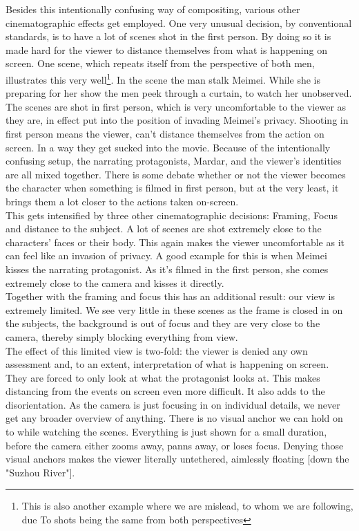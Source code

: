 \documentclass[fleqn,14pt]{article}
\begin{document}
Besides this intentionally confusing way of compositing, various other cinematographic effects get employed.
One very unusual decision, by conventional standards\cite[p. 36]{Dick}, is to have a lot of scenes shot in the first person.
By doing so it is made hard for the viewer to distance
themselves from what is happening on screen. One scene, which repeats itself from the perspective of both men,
illustrates this very well\footnote{This is also another example where we are mislead, to whom we are following, due To
shots being the same from both perspectives}. In the scene the man stalk Meimei. While she is preparing for her
show the men peek through a curtain, to watch her unobserved. The scenes are shot in first person, which is very uncomfortable
to the viewer as they are, in effect put into the position of invading Meimei's privacy. Shooting in first person means the viewer,
can't distance themselves from the action on screen. In a way they get sucked into the movie. Because of the intentionally confusing
setup, the narrating protagonists, Mardar, and the viewer's identities are all mixed together. There is some debate whether or not 
the viewer becomes the character when something is filmed in first person\cite[p. 216]{Bordwell}, but at the very least, it brings them a lot closer to
the actions taken on-screen. \\

This gets intensified by three other cinematographic decisions: Framing, Focus and distance to the subject.
A lot of scenes are shot extremely close to the characters' faces or their body. This again makes the viewer uncomfortable
as it can feel like an invasion of privacy. A good example for this is when Meimei kisses the
narrating protagonist. As it's filmed in the first person, she comes extremely close to the camera and kisses it directly.\\

Together with the framing and focus this has an additional result: our view is extremely limited. We see very little in these scenes
as the frame is closed in on the subjects, the background is out of focus and they are very close to the camera, thereby simply
blocking everything from view.\\
The effect of this limited view is two-fold: the viewer is denied any own assessment and, to an extent, interpretation of what is happening
on screen. They are forced to only look at what the protagonist looks at. This makes distancing from the events on 
screen even more difficult. It also adds to the disorientation. As the camera is just focusing in on individual details, we never
get any broader overview of anything. There is no visual anchor we can hold on to while watching the scenes. Everything is just
shown for a small duration, before the camera either zooms away, panns away, or loses focus. Denying those visual anchors
makes the viewer literally untethered, aimlessly floating [down the "Suzhou River"].\\
\end{document}
